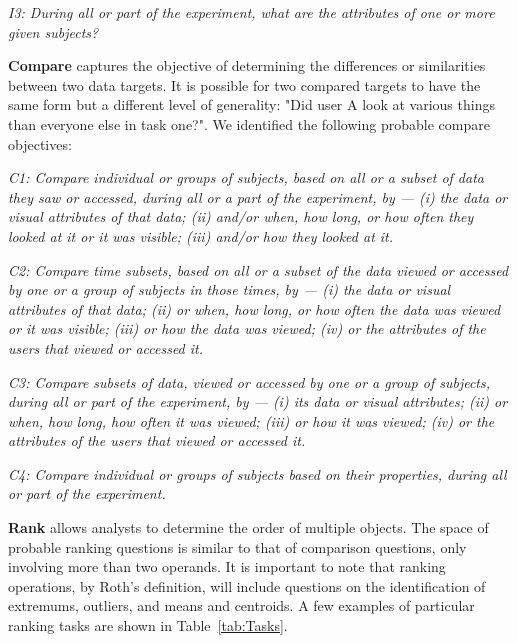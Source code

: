 \vspace{2mm}
\hangindent=3mm\textit{I3: During all or part of the experiment, what are the attributes of one or more given subjects?} 


\vspace{2mm}
\noindent\textbf{Compare} captures the objective of determining the differences or similarities between two data targets. It is possible for two compared targets to have the same form but a different level of generality: "Did user A look at various things than everyone else in task one?". We identified the following probable compare objectives: 

\vspace{2mm}
\hangindent=3mm\textit{C1: Compare individual or groups of subjects, based on all or a subset of data they saw or accessed, during all or a part of the experiment, by --- (i) the data or visual attributes of that data; (ii) and/or when, how long, or how often they looked at it or it was visible; (iii) and/or how they looked at it.}

\vspace{2mm}
\hangindent=3mm\textit{C2: Compare time subsets, based  on all or a subset of the data viewed or accessed by one or a group of subjects in those times, by --- (i) the data or visual attributes of that data; (ii) or when, how long, or how often the data was viewed or it was visible; (iii) or how the data was viewed; (iv) or the attributes of the users that viewed or accessed it.}

\vspace{2mm}
\hangindent=3mm\textit{C3: Compare subsets of data, viewed or accessed by one or a group of subjects, during all or part of the experiment, by --- (i) its data or visual attributes; (ii) or when, how long, how often it was viewed; (iii) or how it was viewed; (iv) or the attributes of the users that viewed or accessed it.}
	
\vspace{2mm}
\hangindent=3mm\textit{C4: Compare individual or groups of subjects based on their properties, during all or part of the experiment.}

\vspace{2mm}
\noindent\textbf{Rank} allows analysts to determine the order of multiple objects. The space of probable ranking questions is similar to that of comparison questions, only involving more than two operands. It is important to note that ranking operations, by Roth's definition, will include questions on the identification of extremums, outliers, and means and centroids. A few examples of particular ranking tasks are shown in Table~\ref{tab:Tasks}. 


